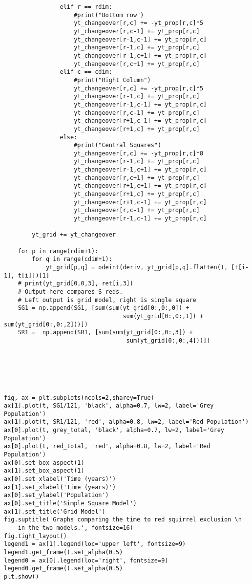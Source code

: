 \documentclass{article}
\begin{document}
\begin{verbatim}
                elif r == rdim:
                    #print("Bottom row")
                    yt_changeover[r,c] += -yt_prop[r,c]*5
                    yt_changeover[r,c-1] += yt_prop[r,c]
                    yt_changeover[r-1,c-1] += yt_prop[r,c]
                    yt_changeover[r-1,c] += yt_prop[r,c]
                    yt_changeover[r-1,c+1] += yt_prop[r,c]
                    yt_changeover[r,c+1] += yt_prop[r,c]                    
                elif c == cdim:
                    #print("Right Column")
                    yt_changeover[r,c] += -yt_prop[r,c]*5
                    yt_changeover[r-1,c] += yt_prop[r,c]
                    yt_changeover[r-1,c-1] += yt_prop[r,c]
                    yt_changeover[r,c-1] += yt_prop[r,c]
                    yt_changeover[r+1,c-1] += yt_prop[r,c]
                    yt_changeover[r+1,c] += yt_prop[r,c]                    
                else:
                    #print("Central Squares")
                    yt_changeover[r,c] += -yt_prop[r,c]*8
                    yt_changeover[r-1,c] += yt_prop[r,c]
                    yt_changeover[r-1,c+1] += yt_prop[r,c]
                    yt_changeover[r,c+1] += yt_prop[r,c]
                    yt_changeover[r+1,c+1] += yt_prop[r,c]
                    yt_changeover[r+1,c] += yt_prop[r,c]
                    yt_changeover[r+1,c-1] += yt_prop[r,c]
                    yt_changeover[r,c-1] += yt_prop[r,c]
                    yt_changeover[r-1,c-1] += yt_prop[r,c]
                    
        yt_grid += yt_changeover
        
    for p in range(rdim+1):
        for q in range(cdim+1):
            yt_grid[p,q] = odeint(deriv, yt_grid[p,q].flatten(), [t[i-1], t[i]])[1]
    # print(yt_grid[0,0,3], ret[i,3])
    # Output here compares S reds.
    # Left output is grid model, right is single square
    SG1 = np.append(SG1, [sum(sum(yt_grid[0:,0:,0]) + 
	                              sum(yt_grid[0:,0:,1]) + sum(yt_grid[0:,0:,2]))])
    SR1 =  np.append(SR1, [sum(sum(yt_grid[0:,0:,3]) + 
	                               sum(yt_grid[0:,0:,4]))])






fig, ax = plt.subplots(ncols=2,sharey=True)
ax[1].plot(t, SG1/121, 'black', alpha=0.7, lw=2, label='Grey Population')
ax[1].plot(t, SR1/121, 'red', alpha=0.8, lw=2, label='Red Population')
ax[0].plot(t, grey_total, 'black', alpha=0.7, lw=2, label='Grey Population')
ax[0].plot(t, red_total, 'red', alpha=0.8, lw=2, label='Red Population')
ax[0].set_box_aspect(1)
ax[1].set_box_aspect(1)
ax[0].set_xlabel('Time (years)')
ax[1].set_xlabel('Time (years)')
ax[0].set_ylabel('Population')
ax[0].set_title('Simple Square Model')
ax[1].set_title('Grid Model')
fig.suptitle('Graphs comparing the time to red squirrel exclusion \n 
	in the two models.', fontsize=16)
fig.tight_layout()
legend1 = ax[1].legend(loc='upper left', fontsize=9)
legend1.get_frame().set_alpha(0.5)
legend0 = ax[0].legend(loc='right', fontsize=9)
legend0.get_frame().set_alpha(0.5)
plt.show()



\end{verbatim}
\end{document}
